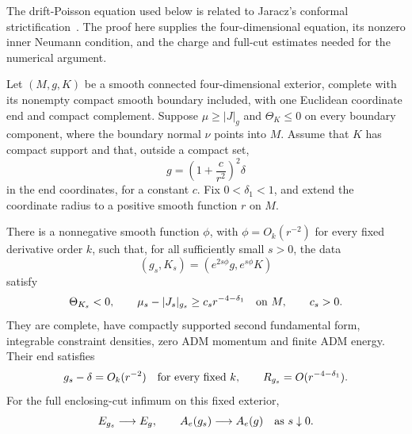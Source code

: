 The drift-Poisson equation used below is related to Jaracz's conformal
strictification~\cite{Jaracz2025StrictDEC}.  The proof here supplies the
four-dimensional equation, its nonzero inner Neumann condition, and the
charge and full-cut estimates needed for the numerical argument.

\begin{lemma}
\label{n4:lem:strictification}
Let \((M,g,K)\) be a smooth connected four-dimensional exterior,
complete with its nonempty compact smooth boundary included, with one
Euclidean coordinate end and compact complement.  Suppose
\(\mu\ge |J|_g\) and \(\Theta_K\le0\) on every boundary component,
where the boundary normal \(\nu\) points into \(M\).  Assume that
\(K\) has compact support and that, outside a compact set,
\[
 g=\left(1+\frac{c}{r^2}\right)^2\delta
\]
in the end coordinates, for a constant \(c\).
Fix \(0<\delta_1<1\), and extend the coordinate radius to a positive
smooth function \(r\) on \(M\).

There is a nonnegative smooth function \(\phi\), with
\(\phi=O_k(r^{-2})\) for every fixed derivative order \(k\), such
that, for all sufficiently small \(s>0\), the data
\[
 (g_s,K_s)=(e^{2s\phi}g,e^{s\phi}K)
\]
satisfy
\begin{equation}\label{n4:eq:strictification-output}
 \Theta_{K_s}<0,\qquad
 \mu_s-|J_s|_{g_s}\ge c_s r^{-4-\delta_1}
 \quad\hbox{on }M,\qquad c_s>0.
\end{equation}
They are complete, have compactly supported second fundamental form,
integrable constraint densities, zero ADM momentum and finite ADM
energy.  Their end satisfies
\begin{equation}\label{n4:eq:strictification-decay}
 g_s-\delta=O_k(r^{-2})\quad\hbox{for every fixed }k,
 \qquad R_{g_s}=O(r^{-4-\delta_1}).
\end{equation}
For the full enclosing-cut infimum on this fixed exterior,
\begin{equation}\label{n4:eq:strictification-limits}
 E_{g_s}\longrightarrow E_g,
 \qquad A_e(g_s)\longrightarrow A_e(g)
 \quad\hbox{as }s\downarrow0.
\end{equation}
\end{lemma}

